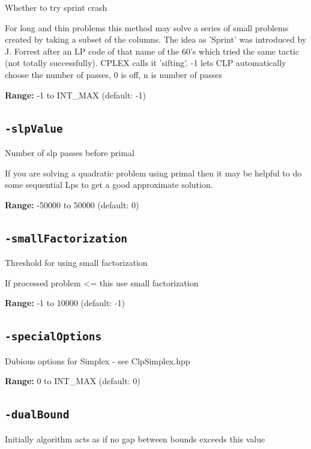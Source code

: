 \documentclass[11pt,a4paper]{article}
\begin{document}
Whether to try sprint crash

For long and thin problems this method may solve a series of small problems created by taking a subset of the columns.  The idea as 'Sprint' was introduced by J. Forrest after an LP code of that name of the 60's which tried the same tactic (not totally successfully). CPLEX calls it 'sifting'.  -1 lets CLP automatically choose the number of passes, 0 is off, n is number of passes

\textbf{Range:} -1 to INT\_MAX (default: -1)

\subsection*{\texttt{-slpValue}}

Number of slp passes before primal

If you are solving a quadratic problem using primal then it may be helpful to do some sequential Lps to get a good approximate solution.

\textbf{Range:} -50000 to 50000 (default: 0)

\subsection*{\texttt{-smallFactorization}}

Threshold for using small factorization

If processed problem <= this use small factorization

\textbf{Range:} -1 to 10000 (default: -1)

\subsection*{\texttt{-specialOptions}}

Dubious options for Simplex - see ClpSimplex.hpp

\textbf{Range:} 0 to INT\_MAX (default: 0)

\subsection*{\texttt{-dualBound}}

Initially algorithm acts as if no gap between bounds exceeds this value
\end{document}
